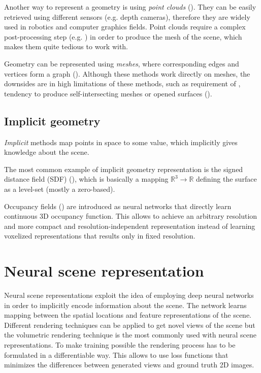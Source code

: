 Another way to represent a geometry is using \textit{point clouds} (\cite{qi2017pointnet, fan2016point}).
They can be easily retrieved using different sensors (e.g. depth cameras),
therefore they are widely used in robotics and computer graphics fields.
Point clouds require a complex post-processing step
(e.g. \cite{ballpivoting1999bernardini}) in order to produce the mesh of the scene,
which makes them quite tedious to work with.

Geometry can be represented using \textit{meshes},
where corresponding edges and vertices form a graph (\cite{wang20183d}).
Although these methods  work directly on meshes,
the downsides are in high limitations of these methods,
such as requirement of ,
tendency to produce self-intersecting meshes or opened surfaces (\cite{groueix2018atlasnet}).

\subsection{Implicit geometry}

\textit{Implicit} methods map points in space to some value,
which implicitly gives knowledge about the scene.

The most common example of implicit geometry representation is the signed distance field (SDF) (\cite{truncdistfield1996curless, Lombardi_2019}),
which is basically a mapping $\mathbb{R}^3 \xrightarrow{} \mathbb{R}$ defining the surface as a level-set (mostly a zero-based).

Occupancy fields (\cite{occupancy2019mescheder}) are introduced as neural networks
that directly learn continuous 3D occupancy function.
This allows to achieve an arbitrary resolution and more compact and resolution-independent representation
instead of learning voxelized representations
that results only in fixed resolution.






\section{Neural scene representation}

Neural scene representations exploit the idea of employing
deep neural networks in order to implicitly encode information about the scene.
The network learns mapping between the spatial locations and feature representations of the scene.
Different rendering techniques can be applied to get novel views of the scene
but the volumetric rendering technique is the most commonly used with neural scene representations.
To make training possible the rendering process has to be formulated in a differentiable way.
This allows to use loss functions that minimizes the differences between generated views and ground truth 2D images.

